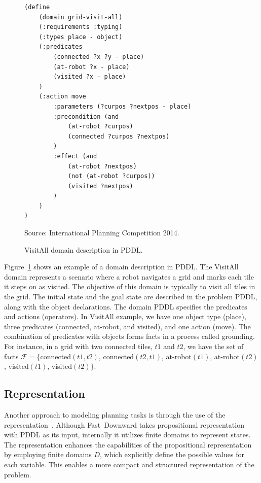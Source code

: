 \begin{figure}[ht]
\caption{VisitAll domain description in PDDL.}
\label{fig:pddl}
\addvspace{\baselineskip}
\centering
\begin{lstlisting}[basicstyle=\ttfamily]
(define
    (domain grid-visit-all)
    (:requirements :typing)
    (:types place - object)
    (:predicates
        (connected ?x ?y - place)
        (at-robot ?x - place)
        (visited ?x - place)
    )
    (:action move
        :parameters (?curpos ?nextpos - place)
        :precondition (and
            (at-robot ?curpos)
            (connected ?curpos ?nextpos)
        )
        :effect (and 
            (at-robot ?nextpos)
            (not (at-robot ?curpos))
            (visited ?nextpos)
        )
    )
)
\end{lstlisting}
Source: International Planning Competition 2014.
\end{figure}

Figure~\ref{fig:pddl} shows an example of a domain description in PDDL. The VisitAll domain represents a scenario where a robot navigates a grid and marks each tile it steps on as visited. The objective of this domain is typically to visit all tiles in the grid. The initial state and the goal state are described in the problem PDDL, along with the object declarations. The domain PDDL specifies the predicates and actions (operators). In VisitAll example, we have one object type (place), three predicates (connected, at-robot, and visited), and one action (move). The combination of predicates with objects forms facts in a process called grounding. For instance, in a grid with two connected tiles, $t1$ and $t2$, we have the set of facts $\mathcal{F}=\{$connected$(t1,t2)$, connected$(t2,t1)$, at-robot$(t1)$, at-robot$(t2)$, visited$(t1)$, visited$(t2)\}$.

\subsection{\sas Representation}
\label{sec:background_sas}

Another approach to modeling planning tasks is through the use of the \sas representation~\cite{Backstrom.Nebel/1995}. Although Fast~Downward takes propositional representation with PDDL as its input, internally it utilizes finite domains to represent states. The \sas representation enhances the capabilities of the propositional representation by employing finite domains $D$, which explicitly define the possible values for each variable. This enables a more compact and structured representation of the problem.

